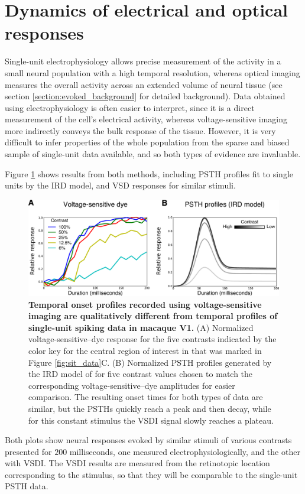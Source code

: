 \documentclass[phd,ianc,twoside]{infthesis}
\begin{document}
\section{Dynamics of electrical and optical responses}

Single-unit electrophysiology allows precise measurement of the
activity in a small neural population with a high temporal resolution,
whereas optical imaging measures the overall activity across an extended volume
of neural tissue (see section \ref{section:evoked_background} for
detailed background). Data obtained using electrophysiology is often easier
to interpret, since it is a direct measurement of the cell's
electrical activity, whereas voltage-sensitive imaging more indirectly
conveys the bulk response of the tissue.  However, it is very
difficult to infer properties of the whole population from the sparse
and biased sample of single-unit data available, and so both types of
evidence are invaluable.

Figure \ref{fig:SIRD_comparison} shows results from both methods,
including PSTH profiles fit to single units by the IRD model, and VSD
responses for similar stimuli.
\begin{figure}
\center
\includegraphics[width=1\textwidth]{./figures/SIRD_comparison.pdf}
 \caption{{\bf Temporal onset profiles recorded using voltage-sensitive
     imaging are qualitatively different from temporal profiles of
     single-unit spiking data in macaque V1.} (A) Normalized
   voltage-sensitive--dye response for the five contrasts indicated by
   the color key for the central region of interest in
   \citet{sit_neuron09} that was marked in Figure
   \ref{fig:sit_data}C. (B) Normalized PSTH profiles generated by the
   IRD model of \citet{albrecht_jneurophys02} for five contrast values
   chosen to match the corresponding voltage-sensitive--dye amplitudes
   for easier comparison. The resulting onset times for both types of
   data are similar, but the PSTHs quickly reach a peak and then decay,
   while for this constant stimulus the VSDI signal slowly reaches a
   plateau.
}
\label{fig:SIRD_comparison}
\end{figure}
Both plots show neural responses evoked by similar stimuli of various
contrasts presented for $200$ milliseconds, one measured
electrophysiologically, and the other with VSDI.  The VSDI results are
measured from the retinotopic location corresponding to the stimulus,
so that they will be comparable to the single-unit PSTH data.
\end{document}
